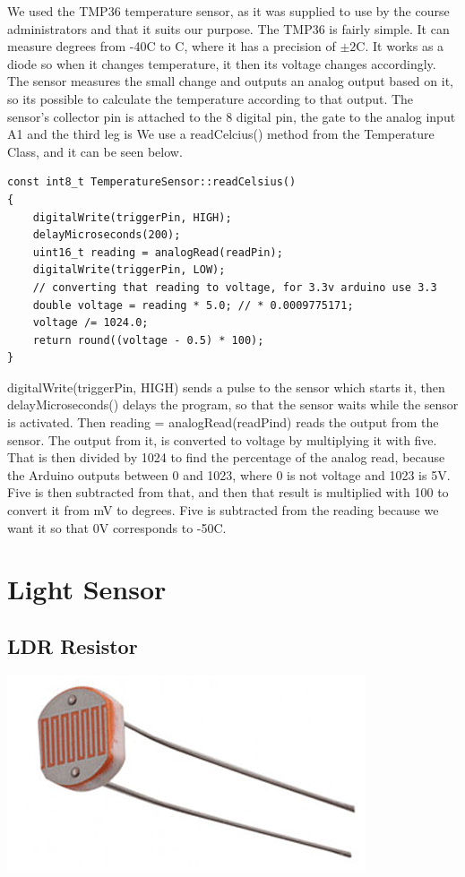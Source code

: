 \documentclass[a4paper,12pt,twoside,openright,titlepage]{book}
\begin{document}
We used the TMP36 temperature sensor, as it was supplied to use by the course administrators and that it suits our purpose. The TMP36 is fairly simple. It can measure degrees from -40\textdegree{}C to C, where it has a precision\cite{tmpTutorial} of $\pm2$\textdegree{}C. It works as a diode so when it changes temperature, it then its voltage changes accordingly. The sensor measures the small change and outputs an analog output based on it, so its possible to calculate the temperature according to that output. 
The sensor's collector pin is attached to the 8 digital pin, the gate to the analog input A1 and the third leg is 
We use a readCelcius() method from the Temperature Class, and it can be seen below.
\begin{lstlisting}[language=Arduino]
const int8_t TemperatureSensor::readCelsius()
{
    digitalWrite(triggerPin, HIGH);
    delayMicroseconds(200);
    uint16_t reading = analogRead(readPin);
    digitalWrite(triggerPin, LOW);
    // converting that reading to voltage, for 3.3v arduino use 3.3
    double voltage = reading * 5.0; // * 0.0009775171;
    voltage /= 1024.0;
    return round((voltage - 0.5) * 100);
}
\end{lstlisting}
digitalWrite(triggerPin, HIGH) sends a pulse to the sensor which starts it, then delayMicroseconds() delays the program, so that the sensor waits while the sensor is activated. Then reading = analogRead(readPind) reads the output from the sensor. The output from it, is converted to voltage by multiplying it with five. That is then divided by 1024 to find the percentage of the analog read, because the Arduino outputs between 0 and 1023, where 0 is not voltage and 1023 is 5V. Five is then subtracted from that, and then that result is multiplied with 100 to convert it from mV to degrees. Five is subtracted from the reading because we want it so that 0V corresponds to -50\textdegree{}C. 

\section{Light Sensor}
\subsection{LDR Resistor}
\includegraphics[scale=0.80]{LDR-Resistor}
\end{document}
